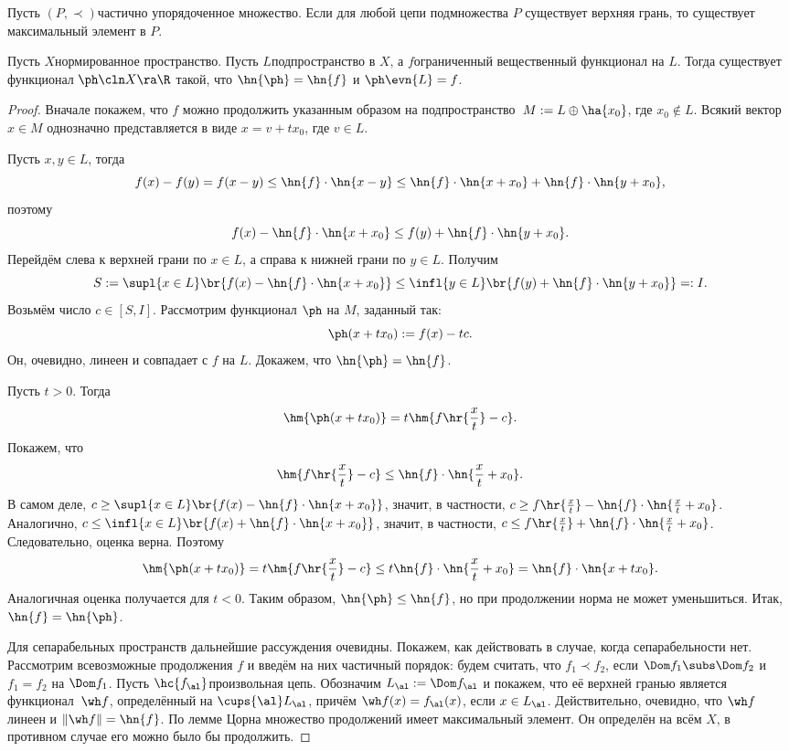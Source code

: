 \documentclass[a4paper]{article}
\begin{document}
\begin{stm}
Пусть $(P, \prec)$\т частично упорядоченное множество. Если для любой цепи
подмножества $P$ существует верхняя грань, то существует максимальный элемент в $P$.
\end{stm}

\begin{theorem}
Пусть $X$\т нормированное пространство. Пусть $L$\т подпространство в $X$, а $f$\т ограниченный
вещественный функционал на $L$. Тогда существует функционал $\ph\cln X \ra \R$ такой, что
$\hn{\ph} = \hn{f}$ и $\ph\evn{L} = f$.
\end{theorem}
\begin{proof}
Вначале покажем, что $f$ можно продолжить указанным образом на подпространство~${M := L \oplus \ha{x_0}}$,
где $x_0 \notin L$. Всякий вектор $x \in M$ однозначно представляется в виде $x = v + t x_0$, где $v \in L$.

Пусть $x,y\in L$, тогда
$$f(x) - f(y) = f(x-y) \le \hn{f}\cdot\hn{x-y} \le \hn{f}\cdot\hn{x+x_0} + \hn{f}\cdot\hn{y+x_0},$$
поэтому
$$f(x) - \hn{f}\cdot\hn{x+x_0} \le f(y)+\hn{f}\cdot\hn{y+x_0}.$$
Перейдём слева к верхней грани по $x \in L$, а справа к нижней грани по $y \in L$. Получим
$$S := \supl{x\in L}\br{f(x) - \hn{f}\cdot\hn{x+x_0}} \le \infl{y\in L}\br{f(y)+\hn{f}\cdot\hn{y+x_0}} =: I.$$
Возьмём число $c \in [S, I]$. Рассмотрим функционал $\ph$ на $M$, заданный так:
$$\ph(x + t x_0) := f(x) - t c.$$
Он, очевидно, линеен и совпадает с $f$ на $L$. Докажем, что $\hn{\ph} = \hn{f}$.

Пусть $t > 0$. Тогда
$$\hm{\ph(x+t x_0)} = t\hm{f\hr{\frac xt} - c}.$$
Покажем, что $$\hm{f\hr{\frac xt} - c} \le \hn{f}\cdot\hn{\frac xt + x_0}.$$
В самом деле, $c \ge \supl{x\in L}\br{f(x) - \hn{f}\cdot\hn{x+x_0}}$, значит,
в частности, $c \ge f\hr{\frac xt} - \hn{f}\cdot\hn{\frac xt+x_0}$. Аналогично,
$c \le \infl{x\in L}\br{f(x) + \hn{f}\cdot\hn{x+x_0}}$, значит,
в частности, $c \le f\hr{\frac xt} + \hn{f}\cdot\hn{\frac xt+x_0}$. Следовательно,
оценка верна. Поэтому
$$\hm{\ph(x+t x_0)} = t\hm{f\hr{\frac xt} - c} \le t \hn{f} \cdot\hn{\frac xt + x_0} = \hn{f}\cdot\hn{x + t x_0}.$$
Аналогичная оценка получается для $t < 0$. Таким образом, $\hn{\ph} \le \hn{f}$, но при продолжении
норма не может уменьшиться. Итак, $\hn{f} = \hn{\ph}$.

Для сепарабельных пространств дальнейшие рассуждения очевидны. Покажем, как действовать в случае,
когда сепарабельности нет. Рассмотрим всевозможные продолжения $f$ и введём на них частичный порядок:
будем считать, что $f_1 \prec f_2$, если $\Dom  f_1 \subs \Dom f_2$ и $f_1 = f_2$ на $\Dom f_1$.
Пусть $\hc{f_\al}$\т произвольная цепь. Обозначим $L_\al := \Dom f_\al$ и покажем, что её
верхней гранью является функционал~$\wh f$, определённый на $\cups{\al} L_\al$, причём $\wh f(x) = f_\al(x)$,
если $x \in L_\al$. Действительно, очевидно, что $\wh f$ линеен и $\|\wh f\| = \hn{f}$. По лемме Цорна
множество продолжений имеет максимальный элемент. Он определён на всём $X$, в противном случае его
можно было бы продолжить.
\end{proof}
\end{document}

